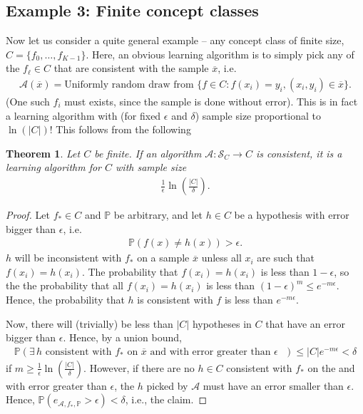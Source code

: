 \documentclass{article}
\newcommand{\calA}{\mathcal{A}}
\newcommand{\calS}{\mathcal{S}}
\newtheorem{theorem}{Theorem}
\newcommand{\abs}[1]{\vert #1 \vert}
\begin{document}
\subsection{Example 3: Finite concept classes} 
Now let us consider a quite general example -- any concept class of finite size, $C= \{f_0, \dots, f_{K-1}\}$. Here, an obvious learning algorithm is to simply pick any of the $f_\ell\in C$ that are consistent with the sample $\overline{x}$, i.e. 
\begin{align*}
    \calA(\overline{x}) = \text{Uniformly random draw from } \{f \in C : f(x_i) = y_i, (x_i,y_i)\in\overline{x}\}.
\end{align*}
(One such $f_i$ must exists, since the sample is done without error). This is in fact a learning algorithm with (for fixed $\epsilon$ and $\delta$) sample size proportional to $\ln(\abs{C})$! This follows from the following
   \begin{theorem}
        Let $C$ be finite. If an algorithm $\calA: \calS_C \to C$ is consistent, it is a learning algorithm for $C$ with sample size 
        \begin{align*}
             \tfrac{1}{\epsilon} \ln \left(\frac{\abs{C}}{\delta}\right).
        \end{align*}
    \end{theorem}
    \begin{proof}
        Let $f_*\in C$ and $\mathbb{P}$ be arbitrary, and let $h\in C$ be a hypothesis with error bigger than $\epsilon$, i.e.
        \begin{align*}
            \mathbb{P}(f(x)\neq h(x))>\epsilon.
        \end{align*}
        $h$ will be inconsistent with $f_*$ on a sample $\overline{x}$ unless all $x_i$ are such that $f(x_i)=h(x_i)$. The probability that $f(x_i)=h(x_i)$ is less than $1-\epsilon$, so the the probability that all $f(x_i)=h(x_i)$ is less than $(1-\epsilon)^m\leq e^{-m\epsilon}$. Hence, the probability that $h$ is consistent with $f$ is less than $e^{-m\epsilon}$.

        Now, there will (trivially) be less than $\abs{C}$ hypotheses in $C$ that have an error bigger than $\epsilon$. Hence, by a union bound,
        \begin{align*}
            \mathbb{P}(\exists \, h \text{ consistent with $f_*$ on $\overline{x}$ and with error greater than $\epsilon$ }) \leq \abs{C}e^{-m\epsilon}<\delta
        \end{align*}
        if $m \geq \tfrac{1}{\epsilon} \ln \left(\frac{\abs{C}}{\delta}\right)$. However, if there are no $h\in C$  consistent with $f_*$ on the and with error greater than $\epsilon$, the $h$ picked by $\calA$ must have an error smaller than $\epsilon$. Hence, $\mathbb{P}(e_{\calA,f_*,\mathbb{P}}>\epsilon)<\delta$, i.e., the claim. 
    \end{proof}
\end{document}
